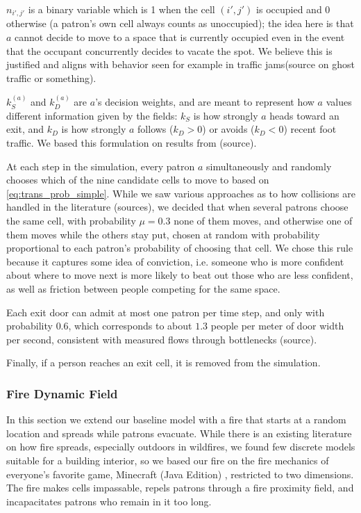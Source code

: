 \documentclass[14pt]{article}
\theoremstyle{definition}
\begin{document}
$n_{i',j'}$ is a binary variable which is 1 when the cell $(i',j')$ is occupied and 0 otherwise (a patron's own cell always counts as unoccupied); the idea here is that $a$ cannot decide to move to a space that is currently occupied even in the event that the occupant concurrently decides to vacate the spot. We believe this is justified and aligns with behavior seen for example in traffic jams(source on ghost traffic or something).

$k_{S}^{(a)}$ and $ k_{D}^{(a)}$ are $a$'s decision weights, and are meant to represent how $a$ values different information given by the fields: $k_S$ is how strongly $a$ heads toward an exit, and $k_D$ is how strongly $a$ follows ($k_D > 0$) or avoids ($k_D < 0$) recent foot traffic. We based this formulation on results from (source).

At each step in the simulation, every patron $a$ simultaneously and randomly chooses which of the nine candidate cells to move to based on \cref{eq:trans_prob_simple}. While we saw various approaches as to how collisions are handled in the literature (sources), we decided that when several patrons choose the same cell, with probability $\mu = 0.3$ none of them moves, and otherwise one of them moves while the others stay put, chosen at random with probability proportional to each patron's probability of choosing that cell. We chose this rule because it captures some idea of conviction, i.e. someone who is more confident about where to move next is more likely to beat out those who are less confident, as well as friction between people competing for the same space.

Each exit door can admit at most one patron per time step, and only with probability $0.6$, which corresponds to about $1.3$ people per meter of door width per second, consistent with measured flows through bottlenecks (source).

Finally, if a person reaches an exit cell, it is removed from the simulation.

\subsubsection{Fire Dynamic Field}\label{sec:fire}
In this section we extend our baseline model with a fire that starts at a random
location and spreads while patrons evacuate. While there is an existing literature on
how fire spreads, especially outdoors in wildfires, we found few discrete models
suitable for a building interior, so we based our fire on the fire mechanics of
everyone's favorite game, Minecraft (Java Edition) \cite{minecraftfire}, restricted to
two dimensions. The fire makes cells impassable, repels patrons through a fire
proximity field, and incapacitates patrons who remain in it too long.
\end{document}
